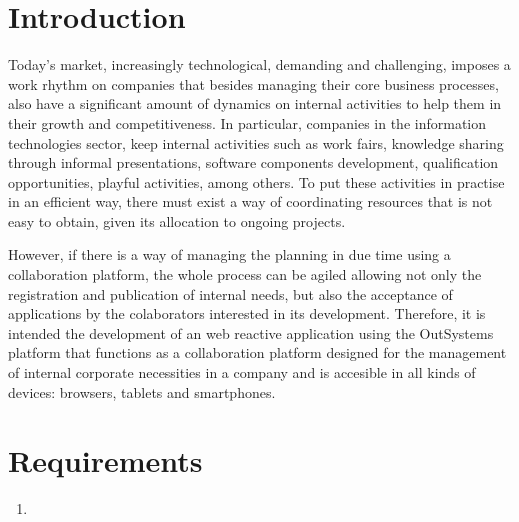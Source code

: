 \documentclass[12pt]{article}
\begin{document}
    
    \section*{Introduction}
    Today's market, increasingly technological, demanding and challenging, imposes a work rhythm on companies that besides managing their core business processes, also have a significant amount of dynamics on internal activities to help them in their growth and competitiveness. In particular, companies in the information technologies sector, keep internal activities such as work fairs, knowledge sharing through informal presentations, software components development, qualification opportunities, playful activities, among others. To put these activities in practise in an efficient way, there must exist a way of coordinating resources that is not easy to obtain, given its allocation to ongoing projects. \par
    However, if there is a way of managing the planning in due time using a collaboration platform, the whole process can be agiled allowing not only the registration and publication of internal needs, but also the acceptance of applications by the colaborators interested in its development. Therefore, it is intended the development of an web reactive application using the OutSystems platform that functions as a collaboration platform designed for the management of internal corporate necessities in a company and is accesible in all kinds of devices: browsers, tablets and smartphones.
    
  \section*{Requirements}

\begin{enumerate}
\item {}
  \end{enumerate}
\end{document}

